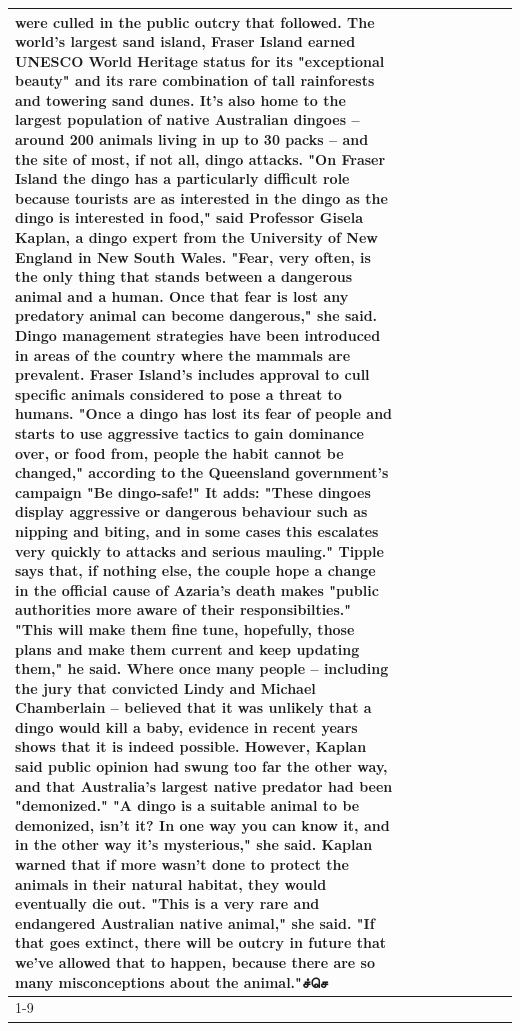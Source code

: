 \begin{table}[H]
\begin{tabular}{lllrlllll}
were culled in the public outcry that followed. The world's largest sand island, Fraser Island earned UNESCO World Heritage status for its "exceptional beauty" and its rare combination of tall rainforests and towering sand dunes. It's also home to the largest population of native Australian dingoes -- around 200 animals living in up to 30 packs -- and the site of most, if not all, dingo attacks. "On Fraser Island the dingo has a particularly difficult role because tourists are as interested in the dingo as the dingo is interested in food," said Professor Gisela Kaplan, a dingo expert from the University of New England in New South Wales. "Fear, very often, is the only thing that stands between a dangerous animal and a human. Once that fear is lost any predatory animal can become dangerous," she said. Dingo management strategies have been introduced in areas of the country where the mammals are prevalent. Fraser Island's includes approval to cull specific animals considered to pose a threat to humans. "Once a dingo has lost its fear of people and starts to use aggressive tactics to gain dominance over, or food from, people the habit cannot be changed," according to the Queensland government's campaign "Be dingo-safe!" It adds: "These dingoes display aggressive or dangerous behaviour such as nipping and biting, and in some cases this escalates very quickly to attacks and serious mauling." Tipple says that, if nothing else, the couple hope a change in the official cause of Azaria's death makes "public authorities more aware of their responsibilties." "This will make them fine tune, hopefully, those plans and make them current and keep updating them," he said. Where once many people -- including the jury that convicted Lindy and Michael Chamberlain -- believed that it was unlikely that a dingo would kill a baby, evidence in recent years shows that it is indeed possible. However, Kaplan said public opinion had swung too far the other way, and that Australia's largest native predator had been "demonized." "A dingo is a suitable animal to be demonized, isn't it? In one way you can know it, and in the other way it's mysterious," she said. Kaplan warned that if more wasn't done to protect the animals in their natural habitat, they would eventually die out. "This is a very rare and endangered Australian native animal," she said. "If that goes extinct, there will be outcry in future that we've allowed that to happen, because there are so many misconceptions about the animal."ச்செ \\
\cline{1-9}

\end{tabular}
\end{table}
